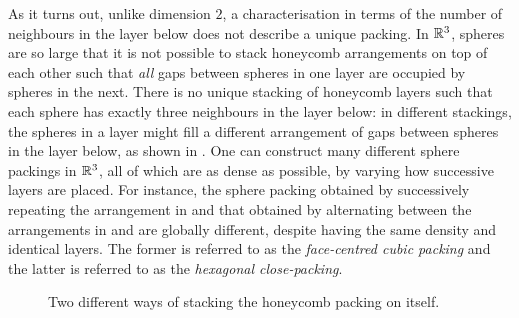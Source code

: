 As it turns out, unlike dimension $2$, a characterisation in terms of the number of neighbours in the layer below does not describe a unique packing. In $\mathbb{R}^3$, spheres are so large that it is not possible to stack honeycomb arrangements on top of each other such that \textit{all} gaps between spheres in one layer are occupied by spheres in the next. There is no unique stacking of honeycomb layers such that each sphere has exactly three neighbours in the layer below: in different stackings, the spheres in a layer might fill a different arrangement of gaps between spheres in the layer below, as shown in . One can construct many different sphere packings in $\mathbb{R}^3$, all of which are as dense as possible, by varying how successive layers are placed. For instance, the sphere packing obtained by successively repeating the arrangement in  and that obtained by alternating between the arrangements in  and  are globally different, despite having the same density and identical layers. The former is referred to as the \textit{face-centred cubic packing} and the latter is referred to as the \textit{hexagonal close-packing}.

\begin{figure}[htb]
    \centering
    \begin{subfigure}{0.48\linewidth}
        \centering
        \subcaption{}
        \label{Ch1:Subfig:3D_Triangular_Stacking}
    \end{subfigure}
    \begin{subfigure}{0.48\linewidth}
        \centering
        \subcaption{}
        \label{Ch1:Subfig:3D_Hexagonal_Stacking}
    \end{subfigure}
    \caption{Two different ways of stacking the honeycomb packing on itself.}
    \label{Ch1:Fig:2_Optimal_3D_Packings}
\end{figure}

